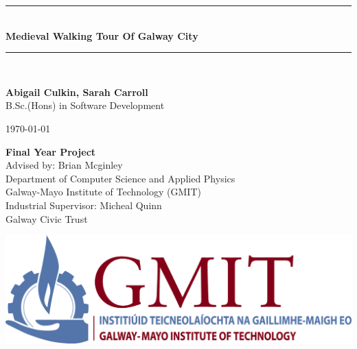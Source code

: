 \documentclass[12pt,a4paper,oneside,openany]{book}
\newcommand{\projecttitle}{Medieval Walking Tour Of Galway City}
\newcommand{\projectauthor}{Abigail Culkin, Sarah Carroll}
\newcommand{\projectadvisor}{Brian Mcginley}
\newcommand{\projectprogramme}{B.Sc.(Hons) in Software Development}
\newcommand{\industrialsupervisor}{Micheal Quinn}
\newcommand{\industrialcompany}{Galway Civic Trust}
\newcommand{\projectdate}{\today}
\begin{document}
  \begin{titlepage}
    \begin{minipage}[t][6cm]{\textwidth}
      \centering
      \rule{\linewidth}{0.5mm} \\[0.4cm]
      { \LARGE \bfseries \projecttitle \\[0.4cm] }
      \rule{\linewidth}{0.5mm} \\[0.8cm]
    \end{minipage}
	
	\begin{minipage}[t][6.5cm]{\textwidth}
      \centering
      \textbf{\projectauthor}\\[0.5cm]
      \projectprogramme
    \end{minipage}
  
    \begin{minipage}[t][1cm]{\textwidth}
      \centering
      \textsc{\projectdate}
    \end{minipage}
      
    \begin{minipage}[t][3cm]{\textwidth}
      \centering
      \textbf{Final Year Project}\\[0.3cm]
      Advised by: \projectadvisor \\[0.1cm]
      Department of Computer Science and Applied Physics\\
      Galway-Mayo Institute of Technology (GMIT)\\
      Industrial Supervisor: \industrialsupervisor\\
      \industrialcompany
	\end{minipage}
	
	\begin{center}    
      \includegraphics{img/gmit-logo.jpg}
    \end{center}
      
 \end{titlepage}

 \setcounter{page}{2}
  \tableofcontents
  \listoffigures
  
  
  
\end{document}
